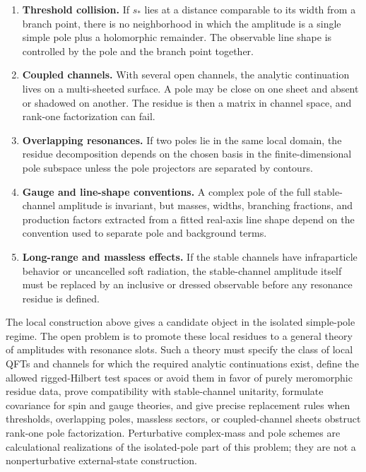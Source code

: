 \begin{enumerate}
\item \textbf{Threshold collision.}  If \(s_\ast\) lies at a distance
comparable to its width from a branch point, there is no neighborhood in which
the amplitude is a single simple pole plus a holomorphic remainder.  The
observable line shape is controlled by the pole and the branch point together.
\item \textbf{Coupled channels.}  With several open channels, the analytic
continuation lives on a multi-sheeted surface.  A pole may be close on one
sheet and absent or shadowed on another.  The residue is then a matrix in
channel space, and rank-one factorization can fail.
\item \textbf{Overlapping resonances.}  If two poles lie in the same local
domain, the residue decomposition depends on the chosen basis in the
finite-dimensional pole subspace unless the pole projectors are separated by
contours.
\item \textbf{Gauge and line-shape conventions.}  A complex pole of the full
stable-channel amplitude is invariant, but masses, widths, branching
fractions, and production factors extracted from a fitted real-axis line shape
depend on the convention used to separate pole and background terms.
\item \textbf{Long-range and massless effects.}  If the stable channels have
infraparticle behavior or uncancelled soft radiation, the stable-channel
amplitude itself must be replaced by an inclusive or dressed observable before
any resonance residue is defined.
\end{enumerate}

\begin{openproblem}
The local construction above gives a candidate object in the isolated
simple-pole regime.  The open problem is to promote these local residues to a
general theory of amplitudes with resonance slots.  Such a theory must specify
the class of local QFTs and channels for which the required analytic
continuations exist, define the allowed rigged-Hilbert test spaces or avoid
them in favor of purely meromorphic residue data, prove compatibility with
stable-channel unitarity, formulate covariance for spin and gauge theories,
and give precise replacement rules when thresholds, overlapping poles,
massless sectors, or coupled-channel sheets obstruct rank-one pole
factorization.  Perturbative complex-mass and pole schemes are calculational
realizations of the isolated-pole part of this problem; they are not a
nonperturbative external-state construction.
\end{openproblem}
